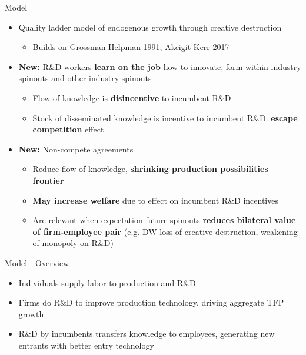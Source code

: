 \documentclass[english,usenames,dvipsnames]{beamer}
\begin{document}
\begin{frame}
\tableofcontents[currentsection]
\end{frame}

\begin{frame}{Model}
\begin{itemize}	
\item Quality ladder model of endogenous growth through creative destruction 
\begin{itemize}
	\item Builds on Grossman-Helpman 1991, Akcigit-Kerr 2017 
\end{itemize}
\item \alert{\textbf{New:}} R\&D workers \textbf{\alert{learn on the job}} how to innovate, form within-industry spinouts and other industry spinouts
\begin{itemize}
	\item Flow of knowledge is \textbf{\alert{disincentive}} to incumbent R\&D
	\item Stock of disseminated knowledge is incentive to incumbent R\&D: \textbf{\alert{escape competition}} effect
\end{itemize} 
\item \alert{\textbf{New:}} Non-compete agreements
\begin{itemize}
	\item Reduce flow of knowledge, \textbf{\alert{shrinking production possibilities frontier}}
	\item \textbf{\alert{May increase welfare}} due to effect on incumbent R\&D incentives
	\item Are relevant when expectation future spinouts \textbf{\alert{reduces bilateral value of firm-employee pair}} (e.g. DW loss of creative destruction, weakening of monopoly on R\&D)
\end{itemize}
\end{itemize}
\end{frame}

\begin{frame}{Model - Overview}
\begin{itemize}
\item Individuals supply labor to production and R\&D
\item Firms do R\&D to improve production technology, driving aggregate TFP growth
\item R\&D by incumbents transfers knowledge to employees, generating new entrants with better entry technology

\end{itemize}
\end{frame}
\end{document}
